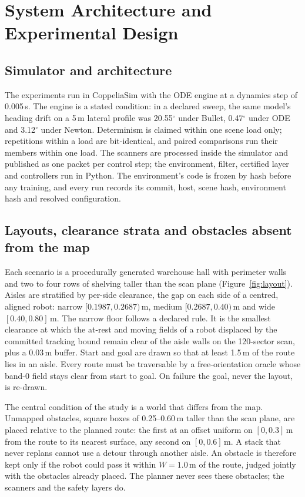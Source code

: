 \documentclass[11pt]{article}
\theoremstyle{definition}
\begin{document}
\section{System Architecture and Experimental Design}\label{sec:design}

\subsection{Simulator and architecture}
The experiments run in CoppeliaSim \citep{rohmer2013vrep} with the ODE engine at a dynamics step of
0.005\,s. The engine is a stated condition: in a declared sweep, the same model's heading drift on a 5\,m
lateral profile was 20.55$^\circ$ under Bullet, 0.47$^\circ$ under ODE and 3.12$^\circ$ under Newton.
Determinism is claimed within one scene load only; repetitions within a load are bit-identical, and
paired comparisons run their members within one load. The scanners are processed inside the simulator and
published as one packet per control step; the environment, filter, certified layer and controllers run in
Python. The environment's code is frozen by hash before any training, and every run records its commit,
host, scene hash, environment hash and resolved configuration.

\subsection{Layouts, clearance strata and obstacles absent from the map}
Each scenario is a procedurally generated warehouse hall with perimeter walls and two to four rows of
shelving taller than the scan plane (Figure~\ref{fig:layout}). Aisles are stratified by per-side
clearance, the gap on each side of a centred, aligned robot: narrow $[0.1987,0.2687)$\,m, medium
$[0.2687,0.40)$\,m and wide $[0.40,0.80]$\,m. The narrow floor follows a declared rule. It is the smallest clearance at which the at-rest and moving fields of a robot displaced by the committed tracking bound remain clear of the aisle walls on the 120-sector scan, plus a 0.03\,m buffer. Start and goal are drawn so that at least 1.5\,m of the route lies in an aisle. Every route must be traversable by a free-orientation oracle whose band-0 field stays clear from start to goal. On failure the goal, never the layout, is re-drawn.

The central condition of the study is a world that differs from the map. Unmapped obstacles, square
boxes of 0.25--0.60\,m taller than the scan plane, are placed relative to the planned route: the first
at an offset uniform on $[0,0.3]$\,m from the route to its nearest surface, any second on $[0,0.6]$\,m.
A stack that never replans cannot use a detour through another aisle. An obstacle is therefore kept only if the robot could pass it within $W=1.0$\,m of the route, judged jointly with the obstacles already placed.
The planner never sees these obstacles; the scanners and the safety layers do.
\end{document}
